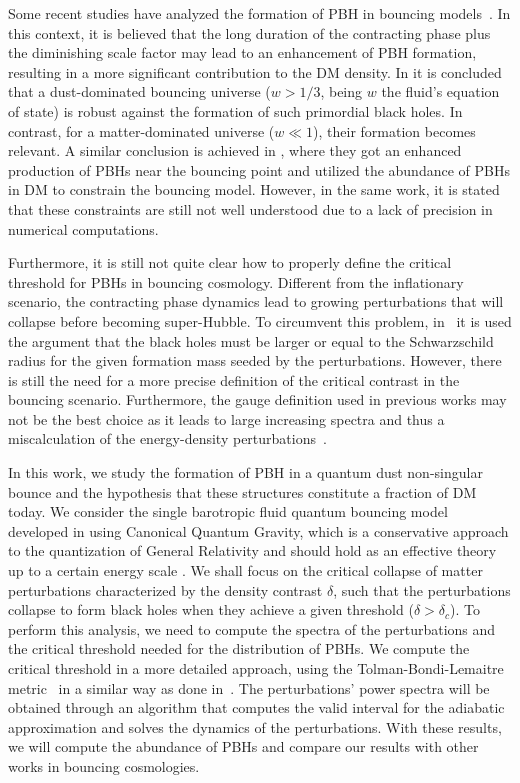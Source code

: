 \documentclass[a4paper,11pt]{article}
\begin{document}
Some recent studies have analyzed the formation of PBH in bouncing
models~\cite{Carr2011, Corman2022, Chen2017, Chen2023, Quintin2016, Banerjee2022,
	Papanikolaou2024}. In this context, it is believed that the long duration of the
contracting phase plus the diminishing scale factor may lead to an enhancement of PBH
formation, resulting in a more significant contribution to the DM density. In
\cite{Quintin2016} it is concluded that a dust-dominated bouncing universe ($w > 1/3$,
being $w$ the fluid's equation of state) is robust against the formation of such
primordial black holes. In contrast, for a matter-dominated universe ($w \ll 1$), their
formation becomes relevant. A similar conclusion is achieved in \cite{Chen2023}, where
they got an enhanced production of PBHs near the bouncing point and utilized the
abundance of PBHs in DM to constrain the bouncing model. However, in the same work, it
is stated that these constraints are still not well understood due to a lack of
precision in numerical computations.

Furthermore, it is still not quite clear how to properly define the critical threshold
for PBHs in bouncing cosmology. Different from the inflationary scenario, the
contracting phase dynamics lead to growing perturbations that will collapse before
becoming super-Hubble. To circumvent this problem, in~\cite{Quintin2016} it is used the
argument that the black holes must be larger or equal to the Schwarzschild radius for
the given formation mass seeded by the perturbations. However, there is still the need
for a more precise definition of the critical contrast in the bouncing scenario.
Furthermore, the gauge definition used in previous works may not be the best choice as
it leads to large increasing spectra and thus a miscalculation of the energy-density
perturbations~\cite{vitenti2012large}.

In this work, we study the formation of PBH in a quantum dust non-singular bounce and
the hypothesis that these structures constitute a fraction of DM today. We consider the
single barotropic fluid quantum bouncing model developed in
\cite{nelson_peter_bouncing_original, nelson2000bohm, nelson2021bouncing} using
Canonical Quantum Gravity, which is a conservative approach to the quantization of
General Relativity and should hold as an effective theory up to a certain energy scale
\cite{nelson2021bouncing}. We shall focus on the critical collapse of matter
perturbations characterized by the density contrast $\delta$, such that the
perturbations collapse to form black holes when they achieve a given threshold ($\delta
	> \delta_c$). To perform this analysis, we need to compute the spectra of the
perturbations and the critical threshold needed for the distribution of PBHs. We compute
the critical threshold in a more detailed approach, using the Tolman-Bondi-Lemaitre
metric~\cite{Tolman1934, Lemaitre1933} in a similar way as done in~\cite{Martin2020}.
The perturbations' power spectra will be obtained through an algorithm that computes the
valid interval for the adiabatic approximation and solves the dynamics of the
perturbations. With these results, we will compute the abundance of PBHs and compare our
results with other works in bouncing cosmologies.
\end{document}

